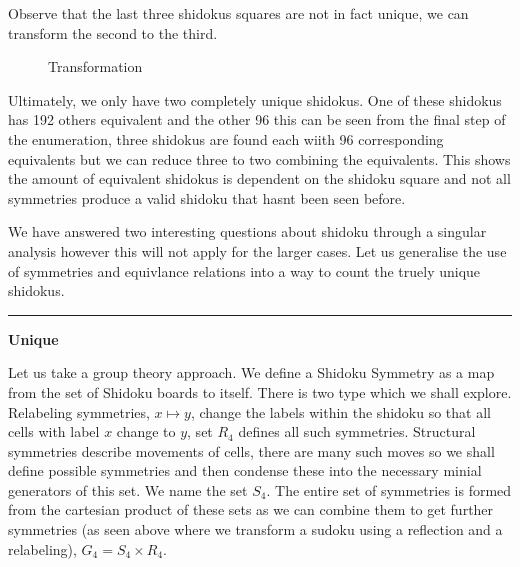 \documentclass[a4paper,11pt]{report}
\newcounter{row}
\newcounter{col}
\newcounter{rowa}
\newcounter{cola}
\newcommand\setrowa[4]{
  \setcounter{cola}{1}
  \foreach \n in {#1, #2, #3, #4} {
    \edef\x{\value{cola} - 0.5}
    \edef\y{4.5 - \value{rowa}}
    \node[anchor=center] at (\x, \y) {\n};
    \stepcounter{cola}
  }
  \stepcounter{rowa}
}
\begin{document}
Observe that the last three shidokus squares are not in fact unique, we can transform the second to the third. 

\begin{figure}[h]
\centering
{}
\caption{Transformation}
\label{fig:shidokutransformation}
\end{figure}

Ultimately, we only have two completely unique shidokus. One of these shidokus has 192 others equivalent and the other 96 this can be seen from the final step of the enumeration, three shidokus are found each wiith 96 corresponding equivalents but we can reduce three to two combining the equivalents. This shows the amount of equivalent shidokus is dependent on the shidoku square and not all symmetries produce a valid shidoku that hasnt been seen before.

We have answered two interesting questions about shidoku through a singular analysis however this will not apply for the larger cases. Let us generalise the use of symmetries and equivlance relations into a way to count the truely unique shidokus.

\noindent\rule{4cm}{0.4pt}

\textbf{Unique}

Let us take a group theory approach. We define a Shidoku Symmetry as a map from the set of Shidoku boards to itself. There is two type which we shall explore. Relabeling symmetries, $x\mapsto y$, change the labels within the shidoku so that all cells with label $x$ change to $y$, set $R_4$ defines all such symmetries. Structural symmetries describe movements of cells, there are many such moves so we shall define possible symmetries and then condense these into the necessary minial generators of this set. We name the set $S_4$. The entire set of symmetries is formed from the cartesian product of these sets as we can combine them to get further symmetries (as seen above where we transform a sudoku using a reflection and a relabeling), $G_4=S_4\times R_4$.
\end{document}
